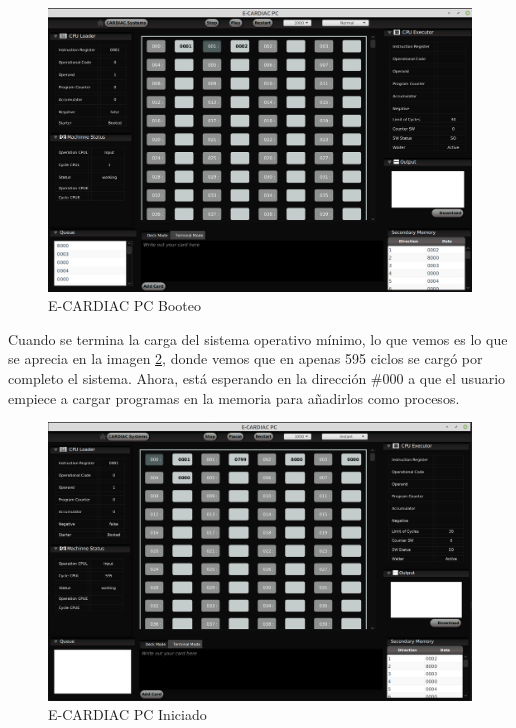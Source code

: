 \documentclass[letterpaper,12pt,oneside]{book}
\begin{document}
			
			\begin{figure}[H]		
				\centering
				\includegraphics[scale=0.35]{media/Paralela/ecardiacpc_booteo.png}
				\caption{ E-CARDIAC PC Booteo}
				\label{fig:ecardiacpc_booteo}
			\end{figure}	
			
			
			Cuando se termina la carga del sistema operativo mínimo, lo que vemos es lo que se aprecia en la imagen \ref{fig:ecardiacpc_booteado}, donde
			vemos que en apenas 595 ciclos se cargó por completo el sistema. Ahora, está esperando en la dirección \#000 a que el usuario empiece
			a cargar programas en la memoria para añadirlos como procesos.

			\begin{figure}[H]		
				\centering
				\includegraphics[scale=0.35]{media/Paralela/ecardiacpc_booteado.png}
				\caption{ E-CARDIAC PC Iniciado}
				\label{fig:ecardiacpc_booteado}
			\end{figure}	
\end{document}
